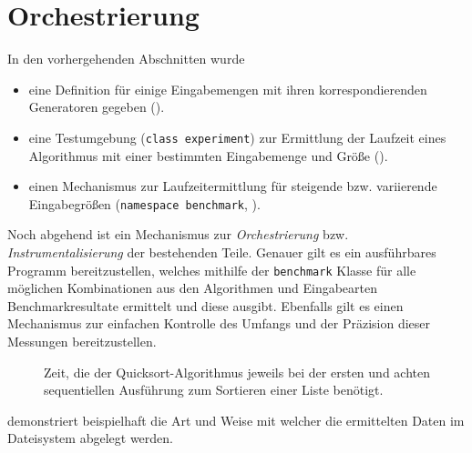 \section{Orchestrierung}

In den vorhergehenden Abschnitten wurde

\begin{itemize}
    \item eine Definition für einige Eingabemengen mit ihren korrespondierenden Generatoren gegeben ().
    \item eine Testumgebung (\lstinline{class experiment}) zur Ermittlung der Laufzeit eines Algorithmus mit einer bestimmten Eingabemenge und Größe ().
    \item einen Mechanismus zur Laufzeitermittlung für steigende bzw. variierende Eingabegrößen (\lstinline{namespace benchmark}, ).
\end{itemize}

Noch abgehend ist ein Mechanismus zur \emph{Orchestrierung} bzw. \emph{Instrumentalisierung} der bestehenden Teile. Genauer gilt es ein ausführbares Programm bereitzustellen, welches mithilfe der \lstinline{benchmark} Klasse für alle möglichen Kombinationen aus den Algorithmen und Eingabearten Benchmarkresultate ermittelt und diese ausgibt. Ebenfalls gilt es einen Mechanismus zur einfachen Kontrolle des Umfangs und der Präzision dieser Messungen bereitzustellen.


\begin{figure}[htp]
	\centering
	\caption{Zeit, die der Quicksort-Algorithmus jeweils bei der ersten und achten sequentiellen Ausführung zum Sortieren einer Liste benötigt.}
	\label{fig:sequential-runs}
\end{figure}



 demonstriert beispielhaft die Art und Weise mit welcher die ermittelten Daten im Dateisystem abgelegt werden.
